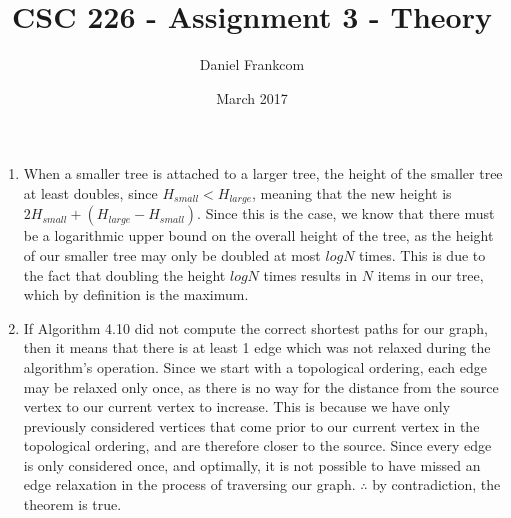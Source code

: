 \documentclass{article}
\title{CSC 226 - Assignment 3 - Theory}
\date{March 2017}
\author{Daniel Frankcom}
\begin{document}
	\maketitle
	\setlength{\parindent}{0pt}
	\newcommand{\forceindent}{\leavevmode{\parindent=72pt\indent}}
	\newpage
	
	\begin{enumerate}
		\item When a smaller tree is attached to a larger tree, the height of the smaller tree at least doubles, since $H_{small}<H_{large}$, meaning that the new height is $2H_{small}+(H_{large}-H_{small})$.
		\newline Since this is the case, we know that there must be a logarithmic upper bound on the overall height of the tree, as the height of our smaller tree may only be doubled at most $logN$ times. This is due to the fact that doubling the height $logN$ times results in $N$ items in our tree, which by definition is the maximum.
		
		\item If Algorithm 4.10 did not compute the correct shortest paths for our graph, then it means that there is at least 1 edge which was not relaxed during the algorithm's operation.
		\newline Since we start with a topological ordering, each edge may be relaxed only once, as there is no way for the distance from the source vertex to our current vertex to increase. This is because we have only previously considered vertices that come prior to our current vertex in the topological ordering, and are therefore closer to the source.
		\newline Since every edge is only considered once, and optimally, it is not possible to have missed an edge relaxation in the process of traversing our graph.
		\newline $\therefore$ by contradiction, the theorem is true.
	\end{enumerate}
\end{document}
